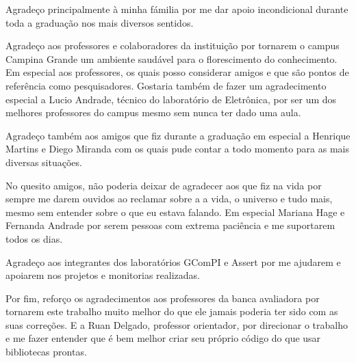 \begin{agradecimentos}
  Agradeço principalmente à minha fámilia por me dar apoio incondicional durante toda a graduação nos mais diversos sentidos.

  Agradeço aos professores e colaboradores da instituição por tornarem o campus Campina Grande um ambiente saudável para o florescimento do conhecimento. Em especial aos professores, os quais posso considerar amigos e que são pontos de referência como pesquisadores. Gostaria também de fazer um agradecimento especial a Lucio Andrade, técnico do laboratório de Eletrônica, por ser um dos melhores professores do campus mesmo sem nunca ter dado uma aula.

  Agradeço também aos amigos que fiz durante a graduação em especial a Henrique Martins e Diego Miranda com os quais pude contar a todo momento para as mais diversas situações.

  No quesito amigos, não poderia deixar de agradecer aos que fiz na vida por sempre me darem ouvidos ao reclamar sobre a a vida, o universo e tudo mais, mesmo sem entender sobre o que eu estava falando. Em especial Mariana Hage e Fernanda Andrade por serem pessoas com extrema paciência e me suportarem todos os dias.

  Agradeço aos integrantes dos laboratórios GComPI e Assert por me ajudarem e apoiarem nos projetos e monitorias realizadas.

  Por fim, reforço os agradecimentos aos professores da banca avaliadora por tornarem este trabalho muito melhor do que ele jamais poderia ter sido com as suas correções. E a Ruan Delgado, professor orientador, por direcionar o trabalho e me fazer entender que é bem melhor criar seu próprio código do que usar bibliotecas prontas.

\end{agradecimentos}
